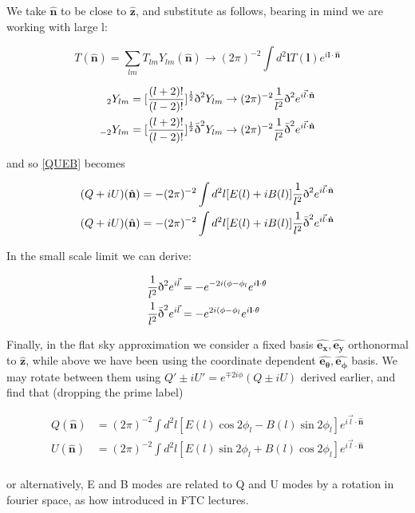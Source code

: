\documentclass[a4paper,11pt]{article}
\renewcommand{\v}[1]{\mathbf{#1}}
\newcommand{\half}{\frac{1}{2}}
\newcommand{\unit}[1]{\hat{\v{#1}}}
\newcommand{\sr}{\text{\normalfont\dh}}
\renewcommand{\sl}{\bar{\text{\normalfont\dh}}}
\newcommand{\ltwo}{[\frac{(l+2)!}{(l-2)!}]}
\begin{document}
We take $\unit{n}$ to be close to $\unit{z}$, and substitute as follows, bearing in mind we are working with large l:

\begin{equation}
T(\unit{n}) = \sum_{lm} T_{lm}Y_{lm}(\unit{n}) \rightarrow (2\pi)^{-2} \int d^2\v{l} T(\v{l})e^{i\v{l}\cdot\unit{n}}
\end{equation}

\begin{align}
{}_2Y_{lm} &= \ltwo^\half\sr^2Y_{lm} \rightarrow (2\pi)^{-2} \frac{1}{l^2}\sr^2e^{i\vec{l}\cdot\unit{n}}\\
{}_{-2}Y_{lm} &= \ltwo^\half\sl^2Y_{lm} \rightarrow (2\pi)^{-2} \frac{1}{l^2}\sl^2e^{i\vec{l}\cdot\unit{n}}
\end{align}

and so \ref{QUEB} becomes

\begin{align}
(Q+iU)(\unit{n}) &= -(2\pi)^{-2}\int d^2l [E(l)+iB(l)]  \frac{1}{l^2}\sr^2e^{i\vec{l}\cdot\unit{n}}\\
(Q+iU)(\unit{n}) &= -(2\pi)^{-2}\int d^2l [E(l)+iB(l)] \frac{1}{l^2}\sl^2e^{i\vec{l}\cdot\unit{n}}
\end{align}

In the small scale limit we can derive:

\begin{align}
\frac{1}{l^2}\sr^2e^{i\vec{l}} &= -e^{-2i(\phi-\phi_l}e^{i\v{l}\cdot\v{\theta}}\\
\frac{1}{l^2}\sl^2e^{i\vec{l}} &= -e^{2i(\phi-\phi_l}e^{i\v{l}\cdot\v{\theta}}
\end{align}

Finally, in the flat sky approximation we consider a fixed basis $\unit{e_x}, \unit{e_y}$ orthonormal to $\unit{z}$, while above we have been using the coordinate dependent $\unit{e_\theta}, \unit{e_\phi}$ basis. We may rotate between them using $Q'\pm iU' = e^{\mp 2i\phi}(Q\pm iU)$ derived earlier, and find that (dropping the prime label)

\begin{align}
Q(\unit{n}) &= (2\pi)^{-2}\int d^2l [E(l)\cos{2\phi_l}-B(l)\sin{2\phi_l}]  e^{i\vec{l}\cdot\unit{n}}\\
U(\unit{n}) &= (2\pi)^{-2}\int d^2l [E(l)\sin{2\phi_l}+B(l)\cos{2\phi_l}]  e^{i\vec{l}\cdot\unit{n}}\\
\end{align}

or alternatively, E and B modes are related to Q and U modes by a rotation in fourier space, as how introduced in FTC lectures. 
\end{document}
